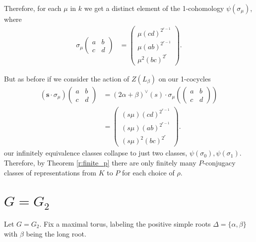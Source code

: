 Therefore, for each $\mu$ in $k$ we get a distinct element of the 1-cohomology $\psi(\sigma_\mu)$, where
\begin{align*}
\sigma_\mu\left(\begin{matrix} a & b \\ c & d \end{matrix}\right) &=
\left(\begin{matrix}  \mu(cd)^{2^{r-1}}  \\ \mu\left(ab \right)^{2^{r-1}} \\ \mu^2\left( bc \right)^{2^r} \end{matrix}\right).
\end{align*}

But as before if we consider the action of $Z(L_\beta)$ on our 1-cocycles
\begin{align*}
(\mathbf{s}\cdot \sigma_\mu)\left(\begin{matrix} a & b \\ c & d \end{matrix}\right) &=
(2\alpha + \beta)^\vee(s) \cdot \sigma_\mu\left(\left(\begin{matrix} a & b \\ c & d \end{matrix}\right)\right)\\
&=
\left(\begin{matrix}  (s\mu)(cd)^{2^{r-1}}  \\ (s\mu)\left(ab \right)^{2^{r-1}} \\ (s\mu)^2\left( bc \right)^{2^r} \end{matrix}\right).
\end{align*}
our infinitely equivalence classes collapse to just two classes, $\psi(\sigma_0), \psi(\sigma_1)$. Therefore, by Theorem \ref{r:finite_p} there are only finitely many $P$-conjugacy classes of representations from $K$ to $P$ for each choice of $\rho$.

	\section{$G = G_2$}
	\label{g2}

	Let $G=G_2$. Fix a maximal torus, labeling the positive simple roots $\Delta=\{\alpha, \beta\}$ with $\beta$ being the long root. 

